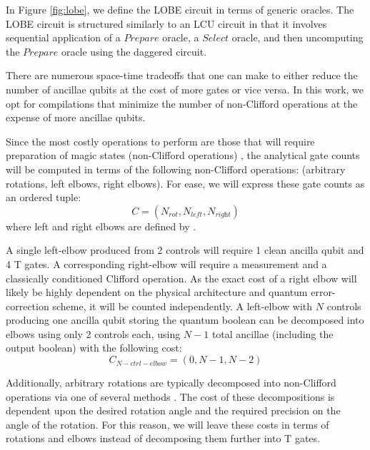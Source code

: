 In Figure \ref{fig:lobe}, we define the LOBE circuit in terms of generic oracles.
The LOBE circuit is structured similarly to an LCU circuit in that it involves sequential application of a $\textit{Prepare}$ oracle, a $\textit{Select}$ oracle, and then uncomputing the $\textit{Prepare}$ oracle using the daggered circuit.

There are numerous space-time tradeoffs that one can make to either reduce the number of ancillae qubits at the cost of more gates or vice versa.
In this work, we opt for compilations that minimize the number of non-Clifford operations at the expense of more ancillae qubits.

Since the most costly operations to perform are those that will require preparation of magic states (non-Clifford operations) , the analytical gate counts will be computed in terms of the following non-Clifford operations: (arbitrary rotations, left elbows, right elbows).
For ease, we will express these gate counts as an ordered tuple:
\begin{equation}
    \label{eq:gate-counts}
    C = (N_{\textit{rot}}, N_{\textit{left}}, N_{\textit{right}})
\end{equation}
where left and right elbows are defined by \cite{babbush2018encoding}.

A single left-elbow produced from 2 controls will require 1 clean ancilla qubit and 4 T gates. 
A corresponding right-elbow will require a measurement and a classically conditioned Clifford operation.
As the exact cost of a right elbow will likely be highly dependent on the physical architecture and quantum error-correction scheme, it will be counted independently.
A left-elbow with $N$ controls producing one ancilla qubit storing the quantum boolean can be decomposed into elbows using only 2 controls each, using $N-1$ total ancillae (including the output boolean) with the following cost:
\begin{equation}
    \label{eq:N-ctrl-elbow}
    C_{N-ctrl-elbow} = (0, N-1, N-2)
\end{equation}

Additionally, arbitrary rotations are typically decomposed into non-Clifford operations via one of several methods \cite{}.  
The cost of these decompositions is dependent upon the desired rotation angle and the required precision on the angle of the rotation.
For this reason, we will leave these costs in terms of rotations and elbows instead of decomposing them further into T gates.

